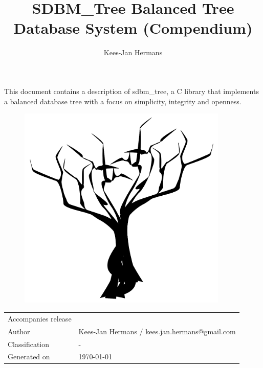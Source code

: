 \documentclass[11pt]{amsart}
\title{SDBM\_Tree Balanced Tree Database System (Compendium)}
\author{Kees-Jan Hermans}
\begin{document}
\maketitle

This document contains a description of sdbm\_tree, a C library that
implements a balanced database tree with a focus on simplicity,
integrity and openness.

\vspace*{3\baselineskip}

\begin{figure}[H]
\centering
\includegraphics[width=100mm]{tree.png}
\end{figure}

\vfill

\begin{table}[]
\centering
\begin{tabular}{ll}
Accompanies release &  \\
Author &  Kees-Jan Hermans / kees.jan.hermans@gmail.com \\
Classification & - \\
Generated on & \today \\
\end{tabular}
\end{table}

% 
% 
% 
\newpage
\tableofcontents

\setlength{\parindent}{4em}
\setlength{\parskip}{1em}

\newpage
\end{document}
